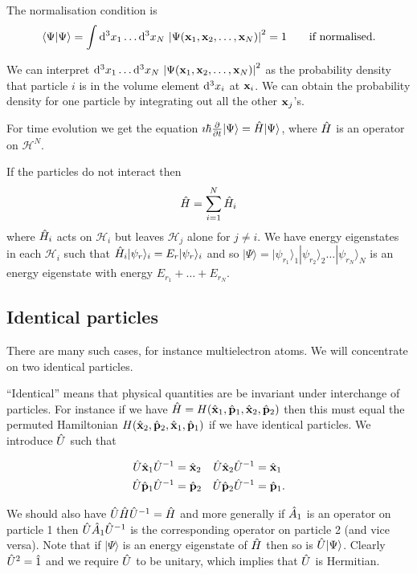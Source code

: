 \documentclass{notes}
\newcommand{\cH}{\mathcal{H}}
\newcommand{\ket}[1]{|#1\rangle}
\newcommand{\scp}[2]{\langle#1|#2\rangle}
\begin{document}
The normalisation condition is
\[
\scp{\Psi}{\Psi} = \int \ud^3 x_1\dots\ud^3 x_N\, \abs{\Psi(\vect{x}_1,
\vect{x}_2, \dots, \vect{x}_N)}^2 = 1 \qquad \text{if normalised.}
\]

We can interpret $\mathrm{d}^3 x_1\dots\mathrm{d}^3 x_N\, \left|\Psi(\mathbf{x}_1,
\mathbf{x}_2, \dots, \mathbf{x}_N)\right|^2$ as the probability density that particle
$i$ is in the volume element $\mathrm{d}^3 x_i$ at $\mathbf{x}_i$.  We can
obtain the probability density for one particle by integrating out all the
other $\mathbf{x}_j$'s.

For time evolution we get the equation $\imath \hbar \pd{}{t} \ket{\Psi}
= \Hat{H} \ket{\Psi}$, where $\Hat{H}$ is an operator on $\cH^N$.

If the particles do not interact then
\[
\Hat{H} = \sum_{i=1}^N \Hat{H}_i
\]
where $\Hat{H}_i$ acts on $\cH_i$ but leaves $\cH_j$ alone for $j \neq i$.
We have energy eigenstates in each $\cH_i$ such that $\Hat{H}_i
\ket{\psi_r}_i = E_r \ket{\psi_r}_i$ and so
$\ket{\Psi} = \ket{\psi_{r_1}}_1 \ket{\psi_{r_2}}_2 \dots \ket{\psi_{r_N}}_N$
is an energy eigenstate with energy $E_{r_1} + \dots + E_{r_N}$.

\subsection{Identical particles}

There are many such cases, for instance multielectron atoms.  We will
concentrate on two identical particles.

``Identical'' means that physical quantities are be invariant under
interchange of particles.  For instance if we have $\Hat{H} =
H(\Hat{\mathbf{x}}_1, \Hat{\mathbf{p}}_1, \Hat{\mathbf{x}}_2,
\Hat{\mathbf{p}}_2)$ then this must equal the permuted Hamiltonian
$H(\Hat{\mathbf{x}}_2, \Hat{\mathbf{p}}_2,\Hat{\mathbf{x}}_1,
\Hat{\mathbf{p}}_1)$ if we have identical particles.  We introduce
$\Hat{U}$ such that

\begin{align*}
\Hat{U} \Hat{\mathbf{x}}_1 \Hat{U}^{-1} &= \Hat{\mathbf{x}}_2
&\Hat{U} \Hat{\mathbf{x}}_2 \Hat{U}^{-1} &= \Hat{\mathbf{x}}_1 \\
\Hat{U} \Hat{\mathbf{p}}_1 \Hat{U}^{-1} &= \Hat{\mathbf{p}}_2
&\Hat{U} \Hat{\mathbf{p}}_2 \Hat{U}^{-1} &= \Hat{\mathbf{p}}_1.
\end{align*}

We should also have $\Hat{U} \Hat{H} \Hat{U}^{-1} = \Hat{H}$ and
more generally if $\Hat{A}_1$ is an operator on particle 1 then
$\Hat{U} \Hat{A}_1 \Hat{U}^{-1}$ is the corresponding operator on particle 2
(and vice versa).  Note that if $\ket{\Psi}$ is an energy eigenstate
of $\Hat{H}$ then so is $\Hat{U}\ket{\Psi}$.  Clearly $\Hat{U}^2 = \Hat{1}$
and we require $\Hat{U}$ to be unitary, which implies that $\Hat{U}$ is
Hermitian.
\end{document}
